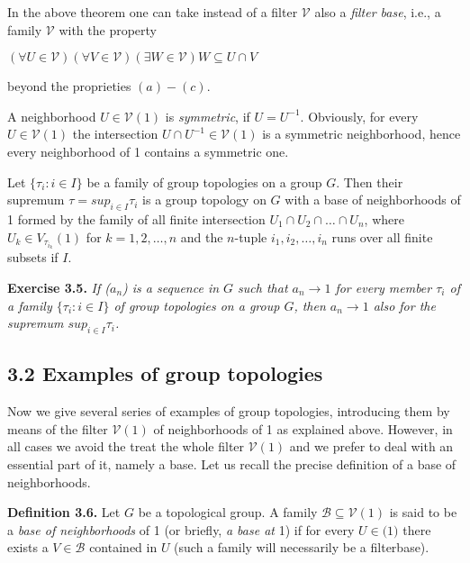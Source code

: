 \documentclass[12pt]{article}
\begin{document}
    
    In the above theorem one can take instead of a filter $\mathcal{V}$ also a \emph{filter base}, i.e., a family $\mathcal{V}$ with the property
    
    
    $(\forall U \in \mathcal{V})(\forall V \in \mathcal{V})(\exists W \in \mathcal{V})W \subseteq U \cap V$
    
    
    beyond the proprieties $(a)-(c)$.


        A neighborhood $U \in \mathcal{V}(1)$ is \emph{symmetric}, if $U = U^{-1}$. Obviously, for every $U \in \mathcal{V}(1)$ the intersection
    $U \cap U^{-1} \in \mathcal{V}(1)$ is a symmetric neighborhood, hence every neighborhood of 1 contains a symmetric one.
    
    
    Let $\{\tau_i : i \in I\}$ be a family of group topologies on a group $G$. Then their supremum $\tau = sup_{i \in I} \tau_i$ is a group
    topology on $G$ with a base of neighborhoods of 1 formed by the family of all finite intersection $U_1 \cap U_2 \cap \dots \cap U_n$,
    where $U_k \in V_{\tau_{i_k}}(1)$ for $k = 1, 2, \dots, n$ and the $n$-tuple $i_1, i_2, \dots , i_n$ runs over all finite subsets if $I$.
    
    
    \textbf{Exercise 3.5.} \emph{If ($a_n$) is a sequence in $G$ such that $a_n \to 1$ for every member $\tau_i$ of a family $\{\tau_i: i \in I\}$ of group
    topologies on a group $G$, then $a_n \to 1$ also for the supremum $sup_{i \in I} \tau_i$.}
    
    
    \subsection{3.2 Examples of group topologies}
    
    
        Now we give several series of examples of group topologies, introducing them by means of the filter $\mathcal{V}(1)$ of
    neighborhoods of 1 as explained above. However, in all cases we avoid the treat the whole filter $\mathcal{V}(1)$ and
    we prefer to deal with an essential part of it, namely a base. Let us recall the precise definition of a base of
    neighborhoods.


    \textbf{Definition 3.6. } Let $G$ be a topological group. A family $\mathcal{B} \subseteq \mathcal{V}(1)$ is said to be a \emph{base of neighborhoods} of 1 (or
    briefly, \emph{a base at} 1) if for every $U \in \mathcal(1)$ there exists a $V \in \mathcal{B}$ contained in $U$ (such a family will necessarily be
    a filterbase).
\end{document}
